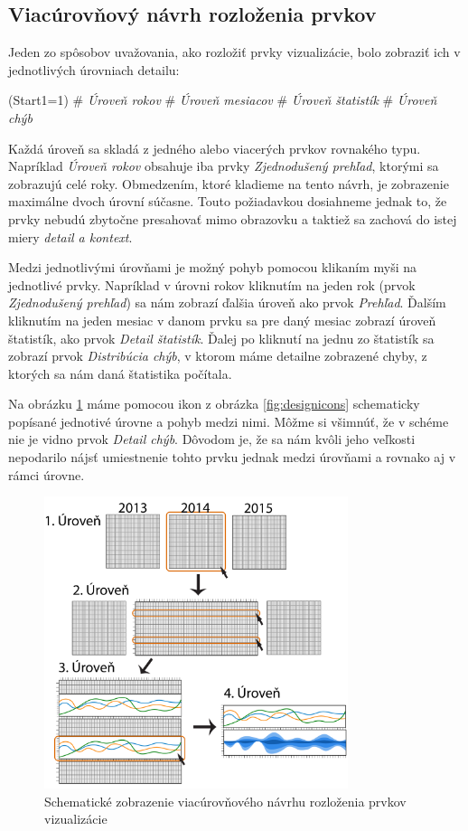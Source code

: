 \subsection{Viacúrovňový návrh rozloženia prvkov}
Jeden zo spôsobov uvažovania, ako rozložiť prvky vizualizácie, bolo zobraziť ich v jednotlivých úrovniach detailu: 
\begin{easylist}
	\ListProperties(Start1=1)
	# \textit{Úroveň rokov}
	# \textit{Úroveň mesiacov}
	# \textit{Úroveň štatistík}
	# \textit{Úroveň chýb} 
\end{easylist}

\noindent Každá úroveň sa skladá z jedného alebo viacerých prvkov rovnakého typu. Napríklad \textit{Úroveň rokov} obsahuje iba prvky \textit{Zjednodušený prehľad}, ktorými sa zobrazujú celé roky. Obmedzením, ktoré kladieme na tento návrh, je zobrazenie maximálne dvoch úrovní súčasne. Touto požiadavkou dosiahneme jednak to, že prvky nebudú zbytočne presahovať mimo obrazovku a taktiež sa zachová do istej miery \textit{detail a kontext}. 

Medzi jednotlivými úrovňami je možný pohyb pomocou klikaním myši na jednotlivé prvky. Napríklad v úrovni rokov kliknutím na jeden rok (prvok \textit{Zjednodušený prehľad}) sa nám zobrazí ďalšia úroveň ako prvok \textit{Prehľad}. Ďalším kliknutím na jeden mesiac v danom prvku sa pre daný mesiac zobrazí úroveň štatistík, ako prvok \textit{Detail štatistík}. Ďalej po kliknutí na jednu zo štatistík sa zobrazí prvok \textit{Distribúcia chýb}, v ktorom máme detailne zobrazené chyby, z ktorých sa nám daná štatistika počítala.

Na obrázku \ref{fig:multilevellayout} máme pomocou ikon z obrázka \ref{fig:designicons} schematicky popísané jednotivé úrovne a pohyb medzi nimi. Môžme si všimnúť, že v schéme nie je vidno prvok \textit{Detail chýb}. Dôvodom je, že sa nám kvôli jeho veľkosti nepodarilo nájsť umiestnenie tohto prvku jednak medzi úrovňami a rovnako aj v rámci úrovne.

\begin{figure}
	\centering
	\includegraphics[width = 3.5in]{multilevellayout}
	\caption{Schematické zobrazenie viacúrovňového návrhu rozloženia prvkov vizualizácie}
	\label{fig:multilevellayout}
\end{figure}


